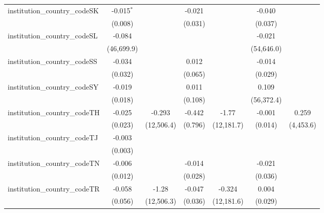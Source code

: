 \begin{tabular}{lcccccc}
   institution\_country\_codeSK          & -0.015$^{*}$   &               & -0.021        &               & -0.040        &   \\   
                                         & (0.008)        &               & (0.031)       &               & (0.037)       &   \\   
   institution\_country\_codeSL          & -0.084         &               &               &               & -0.021        &   \\   
                                         & (46,699.9)     &               &               &               & (54,646.0)    &   \\   
   institution\_country\_codeSS          & -0.034         &               & 0.012         &               & -0.014        &   \\   
                                         & (0.032)        &               & (0.065)       &               & (0.029)       &   \\   
   institution\_country\_codeSY          & -0.019         &               & 0.011         &               & 0.109         &   \\   
                                         & (0.018)        &               & (0.108)       &               & (56,372.4)    &   \\   
   institution\_country\_codeTH          & -0.025         & -0.293        & -0.442        & -1.77         & -0.001        & 0.259\\   
                                         & (0.023)        & (12,506.4)    & (0.796)       & (12,181.7)    & (0.014)       & (4,453.6)\\   
   institution\_country\_codeTJ          & -0.003         &               &               &               &               &   \\   
                                         & (0.003)        &               &               &               &               &   \\   
   institution\_country\_codeTN          & -0.006         &               & -0.014        &               & -0.021        &   \\   
                                         & (0.012)        &               & (0.028)       &               & (0.036)       &   \\   
   institution\_country\_codeTR          & -0.058         & -1.28         & -0.047        & -0.324        & 0.004         &   \\   
                                         & (0.056)        & (12,506.3)    & (0.036)       & (12,181.6)    & (0.029)       &   \\   

\end{tabular}
